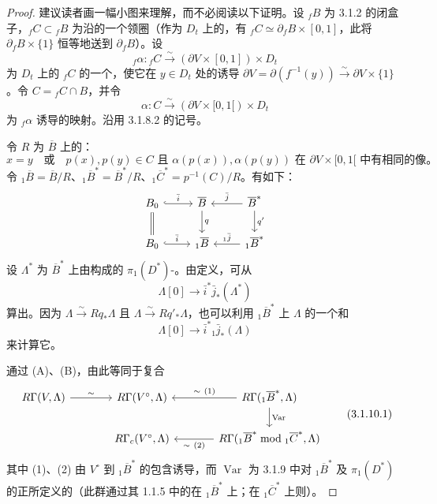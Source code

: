 \begin{proof}
建议读者画一幅小图来理解，而不必阅读以下证明。设 ${}_fB$ 为 3.1.2 的闭盒子，${}_fC\subset{}_fB$ 为沿的一个领圈（作为 $D_t$ 上的，有 ${}_fC\simeq\partial{}_fB\times[0,1]$，此将 $\partial{}_fB\times\{1\}$ 恒等地送到 $\partial{}_fB$）。设
\[
 {}_f\alpha:{}_fC\xrightarrow{\sim}(\partial V\times[0,1])\times D_t
\]
为 $D_t$ 上的 ${}_fC$ 的一个，使它在 $y\in D_t$ 处的诱导 $\partial V=\partial(f^{-1}(y))\xrightarrow{\sim}\partial V\times\{1\}$。令 $C={}_fC\cap B$，并令
\[
 \alpha:C\xrightarrow{\sim}(\partial V\times[0,1[)\times D_t
\]
为 ${}_f\alpha$ 诱导的映射。沿用 3.1.8.2 的记号。

令 $R$ 为 $\overline B$ 上的：
\[
 x=y\quad\text{或}\quad p(x),p(y)\in C\text{ 且 }\alpha(p(x)),\alpha(p(y))
 \text{ 在 }\partial V\times[0,1[\text{ 中有相同的像。}
\]
令 ${}_1\overline B=\overline B/R$、${}_1\overline B^*=\overline B^*/R$、${}_1\overline C^*=p^{-1}(C)/R$。有如下：
\[
\begin{tikzcd}
 B_0\arrow[r,hook,"\bar i"]\arrow[d,equal]&\overline B\arrow[d,"q"]&\overline B^*\arrow[l,"\bar j"']\arrow[d,"q'"]\\
 B_0\arrow[r,hook,"\bar i"]&{}_1\overline B&{}_1\overline B^*\arrow[l,"{}_1\bar j"']
\end{tikzcd}
\]
设 $\Lambda^*$ 为 $\overline B^*$ 上由构成的 $\pi_1(D^*)$-。由定义，可从
\[
 \Lambda[0]\longrightarrow\bar i^*\bar j_*(\Lambda^*)
\]
算出。因为 $\Lambda\xrightarrow{\sim}Rq_*\Lambda$ 且 $\Lambda\xrightarrow{\sim}Rq'_*\Lambda$，也可以利用 ${}_1\overline B^*$ 上 $\Lambda$ 的一个和
\[
 \Lambda[0]\longrightarrow\bar i^*{}_1\bar j_*(\Lambda)
\]
来计算它。

通过 (A)、(B)，由此等同于复合
\[
\begin{tikzcd}[column sep=large]
 R\Gamma(V,\Lambda)\arrow[r,"\sim"]&R\Gamma(V^\circ,\Lambda)&R\Gamma({}_1\overline B^*,\Lambda)\arrow[l,"\sim\ (1)"']\arrow[d,"\operatorname{Var}"]\\
 &R\Gamma_c(V^\circ,\Lambda)&R\Gamma({}_1\overline B^*\bmod{}_1\overline C^*,\Lambda)\arrow[l,"\sim\ (2)"]
\end{tikzcd}\tag{3.1.10.1}
\]
其中 (1)、(2) 由 $V^\circ$ 到 ${}_1\overline B^*$ 的包含诱导，而 $\operatorname{Var}$ 为 3.1.9 中对 ${}_1\overline B^*$ 及 $\pi_1(D^*)$ 的正所定义的（此群通过其 1.1.5 中的在 ${}_1\overline B^*$ 上；在 ${}_1\overline C^*$ 上则）。


\end{proof}
